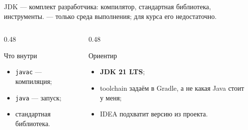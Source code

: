 \begin{frame}{JDK}
   --- комплект разработчика: компилятор, стандартная библиотека,
  инструменты.  --- только среда выполнения; для курса его недостаточно.

  \medskip
  \begin{columns}[T]
    \begin{column}{0.48\textwidth}
      \begin{block}{Что внутри}
        \begin{itemize}
          \item \texttt{javac} --- компиляция;
          \item \texttt{java} --- запуск;
          \item стандартная библиотека.
        \end{itemize}
      \end{block}
    \end{column}
    \begin{column}{0.48\textwidth}
      \begin{block}{Ориентир}
        \begin{itemize}
          \item \textbf{JDK 21 LTS};
          \item toolchain задаём в Gradle, а не \flqq какая Java стоит у меня\frqq;
          \item IDEA подхватит версию из проекта.
        \end{itemize}
      \end{block}
    \end{column}
  \end{columns}
\end{frame}
